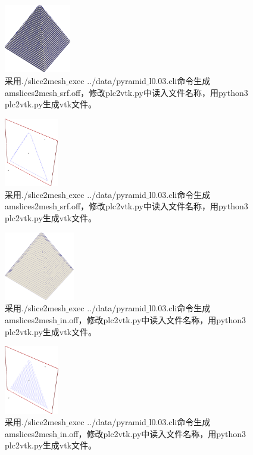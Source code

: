 \begin{figure}[!htbp]
  \centering
  \includegraphics[height=3cm]{fig/1/1.1.7.1:3.png}
  \caption{采用./slice2mesh$\_$exec ../data/pyramid$\_$l0.03.cli命令生成amslices2mesh$\_$srf.off，修改plc2vtk.py中读入文件名称，用python3 plc2vtk.py生成vtk文件。}
  \label{fig:1-7}
\end{figure}

\begin{figure}[!htbp]
  \centering
  \includegraphics[height=3cm]{fig/1/1.1.7.1:4.png}
  \caption{采用./slice2mesh$\_$exec ../data/pyramid$\_$l0.03.cli命令生成amslices2mesh$\_$srf.off，修改plc2vtk.py中读入文件名称，用python3 plc2vtk.py生成vtk文件。}
  \label{fig:1-7}
\end{figure}

\begin{figure}[!htbp]
  \centering
  \includegraphics[height=3cm]{fig/1/1.1.7.1:5.png}
  \caption{采用./slice2mesh$\_$exec ../data/pyramid$\_$l0.03.cli命令生成amslices2mesh$\_$in.off，修改plc2vtk.py中读入文件名称，用python3 plc2vtk.py生成vtk文件。}
  \label{fig:1-7}
\end{figure}

\begin{figure}[!htbp]
  \centering
  \includegraphics[height=3cm]{fig/1/1.1.7.1:6.png}
  \caption{采用./slice2mesh$\_$exec ../data/pyramid$\_$l0.03.cli命令生成amslices2mesh$\_$in.off，修改plc2vtk.py中读入文件名称，用python3 plc2vtk.py生成vtk文件。}
  \label{fig:1-7}
\end{figure}


